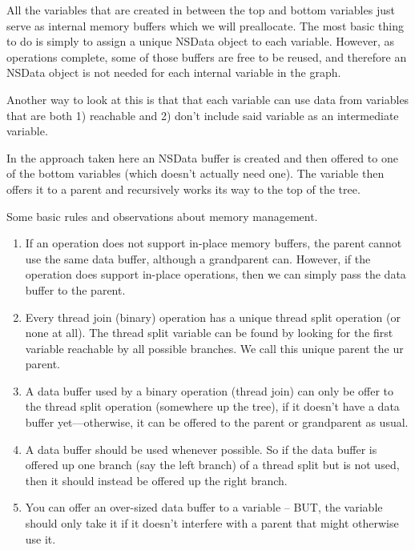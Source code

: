 \documentclass[11pt]{article}
\begin{document}
All the variables that are created in between the top and bottom variables just serve as internal memory buffers which we will preallocate. The most basic thing to do is simply to assign a unique NSData object to each variable. However, as operations complete, some of those buffers are free to be reused, and therefore an NSData object is not needed for each internal variable in the graph.

Another way to look at this is that that each variable can use data from variables that are both 1) reachable and 2) don't include said variable as an intermediate variable.

In the approach taken here an NSData buffer is created and then offered to one of the bottom variables (which doesn't actually need one). The variable then offers it to a parent and recursively works its way to the top of the tree.

Some basic rules and observations about memory management.
\begin{enumerate}
\item If an operation does not support in-place memory buffers, the parent cannot use the same data buffer, although a grandparent can. However, if the operation does support in-place operations, then we can simply pass the data buffer to the parent.

\item Every thread join (binary) operation has a unique thread split operation (or none at all). The thread split variable can be found by looking for the first variable reachable by all possible branches. We call this unique parent the ur parent.

\item A data buffer used by a binary operation (thread join) can only be offer to the thread split operation (somewhere up the tree), if it doesn't have a data buffer yet---otherwise, it can be offered to the parent or grandparent as usual.

\item A data buffer should be used whenever possible. So if the data buffer is offered up one branch (say the left branch) of a thread split but is not used, then it should instead be offered up the right branch.

\item You can offer an over-sized data buffer to a variable -- BUT, the variable should only take it if it doesn't interfere with a parent that might otherwise use it.

\end{enumerate}
\end{document}
